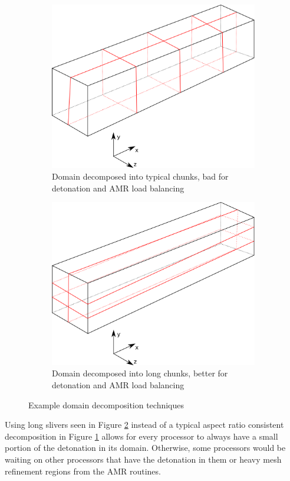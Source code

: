 \begin{figure}[]
    \centering
    \begin{subfigure}[]{0.7\textwidth}
        \centering
        \includegraphics[width=\textwidth]{./figs/parallel_short.png}
        \caption{Domain decomposed into typical chunks, bad for detonation and AMR load balancing}
        \label{sfig:shortdecomp}
    \end{subfigure}

    \begin{subfigure}[]{0.7\textwidth}
        \centering
        \includegraphics[width=\textwidth]{./figs/parallel_long.png}
        \caption{Domain decomposed into long chunks, better for detonation and AMR load balancing}
        \label{sfig:longdecomp}
    \end{subfigure}
    \caption{Example domain decomposition techniques}
    \label{fig:decomp}
\end{figure}%
\noindent Using long slivers seen in Figure \ref{sfig:longdecomp} instead of a typical aspect ratio consistent decomposition in Figure \ref{sfig:shortdecomp} allows for every processor to always have a small portion of the detonation in its domain. Otherwise, some processors would be waiting on other processors that have the detonation in them or heavy mesh refinement regions from the AMR routines.


